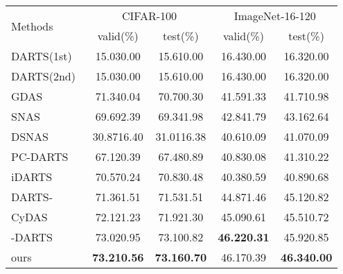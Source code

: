 \documentclass[10pt,twocolumn,letterpaper]{article}
\begin{document}
\begin{table}
\begin{center}
{\begin{tabular}{lcccc}
          \toprule
          \multirow{2}{*}{Methods}                              & \multicolumn{2}{c}{CIFAR-100}  & \multicolumn{2}{c}{ImageNet-16-120}\\
          \cmidrule(r){2-5}
                                                                           & valid(\%)           & test(\%)            & valid(\%)           & test(\%)         \\
          \midrule
          DARTS(1st)~\cite{liu2018darts}                                       & 15.030.00          & 15.610.00          & 16.430.00          & 16.320.00          \\
          DARTS(2nd)~\cite{liu2018darts}                                      & 15.030.00          & 15.610.00          & 16.430.00          & 16.320.00          \\
          GDAS~\cite{Dong_2019_gdas}                                          & 71.340.04          & 70.700.30          & 41.591.33          & 41.710.98          \\
          SNAS~\cite{xie2018snas}                                               & 69.692.39          & 69.341.98          & 42.841.79          & 43.162.64          \\
          DSNAS~\cite{Hu_2020_dsnas}                                             & 30.8716.40         & 31.0116.38         & 40.610.09          & 41.070.09          \\
          PC-DARTS~\cite{Xu2020PC-DARTS}                                       & 67.120.39          & 67.480.89          & 40.830.08          & 41.310.22          \\
          iDARTS~\cite{zhang21s_idarts}                                        & 70.570.24          & 70.830.48          & 40.380.59          & 40.890.68          \\
          DARTS-~\cite{chu2021dartsminus}                                     & 71.361.51          & 71.531.51          & 44.871.46          & 45.120.82          \\
          CyDAS~\cite{Yu_2022_cdarts}                                          & 72.121.23          & 71.921.30          & 45.090.61          & 45.510.72          \\
          -DARTS~\cite{ye_2022_beta}                          & 73.020.95          & 73.100.82          & \textbf{46.220.31} & 45.920.85          \\
          ours                                                                & \textbf{73.210.56} & \textbf{73.160.70}  & 46.170.39          & \textbf{46.340.00} \\

\end{tabular}}
\end{center}
\end{table}
\end{document}
